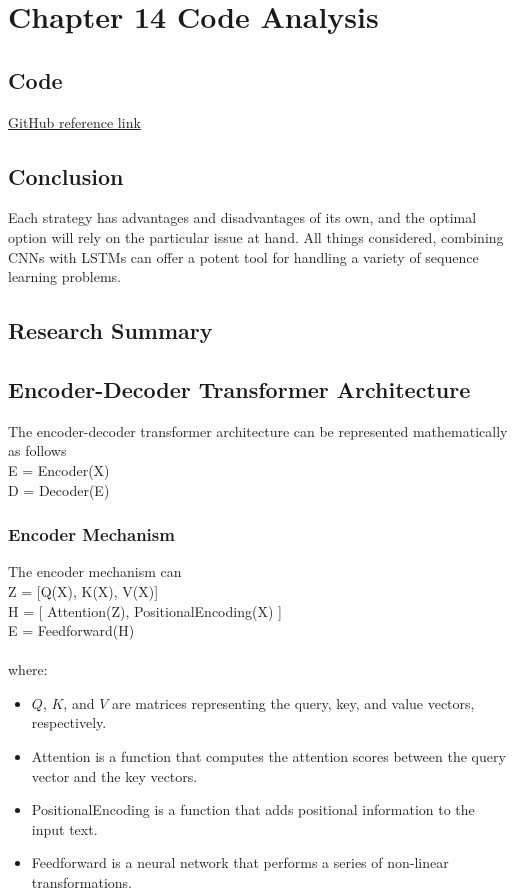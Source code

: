 \documentclass{article}
\begin{document}
\section{Chapter 14 Code Analysis}

\subsection{Code}
\href{https://github.com/mijanr/TimeSeries/blob/master/Time_Series_Classification/cnn_plus_lstm.ipynb}{GitHub reference link}

\subsection{Conclusion}
Each strategy has advantages and disadvantages of its own, and the optimal option will rely on the particular issue at hand. All things considered, combining CNNs with LSTMs can offer a potent tool for handling a variety of sequence learning problems.

\subsection{Research Summary}

\subsection{Encoder-Decoder Transformer Architecture}
The encoder-decoder transformer architecture can be represented mathematically as follows \\
E = Encoder(X) \\ 
D = Decoder(E) \\
\subsubsection{Encoder Mechanism}
The encoder mechanism can \\
    Z = [Q(X), K(X), V(X)] \\
    H = [ Attention(Z), PositionalEncoding(X) ] \\
    E = Feedforward(H) \\ \\
where:
\begin{itemize}
    \item $Q$, $K$, and $V$ are matrices representing the query, key, and value vectors, respectively.
    \item  Attention is a function that computes the attention scores between the query vector and the key vectors.
    \item PositionalEncoding is a function that adds positional information to the input text.
    \item Feedforward is a neural network that performs a series of non-linear transformations.
\end{itemize}
\end{document}
